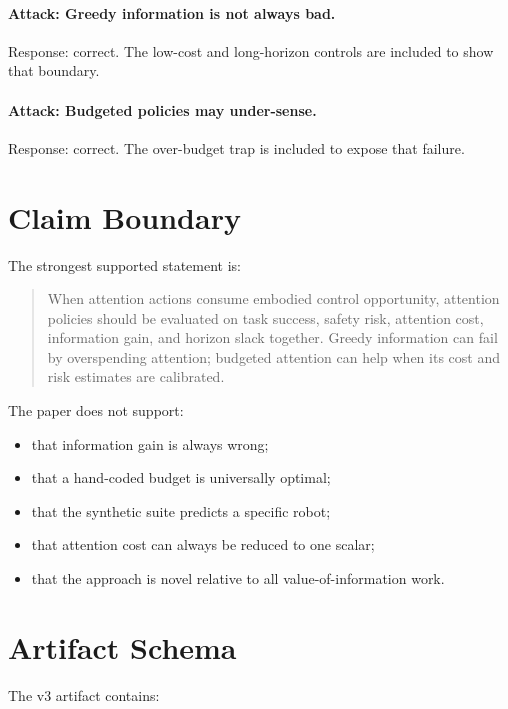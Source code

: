 \documentclass{article}
\begin{document}
\paragraph{Attack: Greedy information is not always bad.}
Response: correct. The low-cost and long-horizon controls are included to show
that boundary.

\paragraph{Attack: Budgeted policies may under-sense.}
Response: correct. The over-budget trap is included to expose that failure.

\section{Claim Boundary}

The strongest supported statement is:

\begin{quote}
When attention actions consume embodied control opportunity, attention
policies should be evaluated on task success, safety risk, attention cost,
information gain, and horizon slack together. Greedy information can fail by
overspending attention; budgeted attention can help when its cost and risk
estimates are calibrated.
\end{quote}

The paper does not support:

\begin{itemize}
    \item that information gain is always wrong;
    \item that a hand-coded budget is universally optimal;
    \item that the synthetic suite predicts a specific robot;
    \item that attention cost can always be reduced to one scalar;
    \item that the approach is novel relative to all value-of-information work.
\end{itemize}

\section{Artifact Schema}

The v3 artifact contains:
\end{document}
